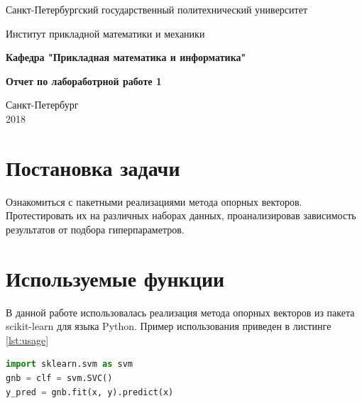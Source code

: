 \documentclass[a4paper,14pt]{article}
\begin{document}
\begin{titlepage}
\newpage

\begin{center}
Санкт-Петербургский государственный политехнический университет \\
\end{center}

\begin{center}
Институт прикладной математики и механики \\ 
\end{center}

\begin{center}
\textbf{Кафедра "Прикладная математика и информатика"} \\ 
\end{center}

\vspace{2em}

\begin{center}
\LARGE{\textbf{Отчет по лабоработрной работе 1}}
\end{center}

\vspace{14em}


\begin{center}
Санкт-Петербург \\2018
\end{center}

\end{titlepage}

\section{Постановка задачи}
Ознакомиться с пакетными реализациями метода опорных векторов. Протестировать их на различных наборах данных, проанализировав зависимость результатов от подбора гиперпараметров.

\section{Используемые функции}

В данной работе использовалась реализация метода опорных векторов из пакета scikit-learn для языка Python. Пример использования приведен в листинге \ref{lst:usage}

\begin{lstlisting}[caption={Использование svm из пакета scikit-learn}, label={lst:usage}, language=Python]
import sklearn.svm as svm
gnb = clf = svm.SVC()
y_pred = gnb.fit(x, y).predict(x)
\end{lstlisting}
\end{document}

